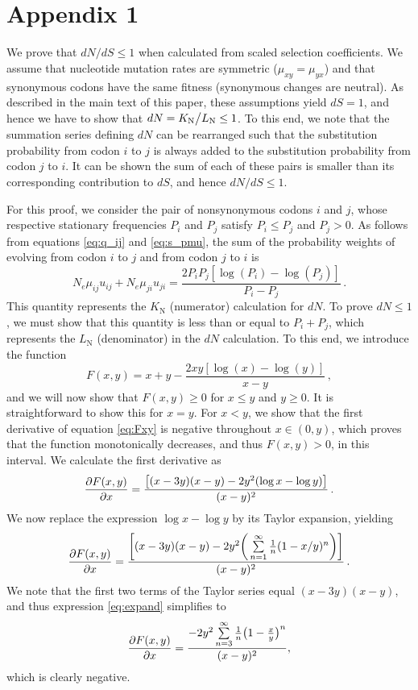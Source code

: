 \documentclass[11pt]{article}
\begin{document}
\section*{Appendix 1}
We prove that $dN/dS \leq 1$ when calculated from scaled selection coefficients. We assume that nucleotide mutation rates are symmetric ($\mu_{xy} = \mu_{yx}$) and that synonymous codons have the same fitness (synonymous changes are neutral). As described in the main text of this paper, these assumptions yield $dS = 1$, and hence we have to show that $dN = K_\text{N}\big{/}L_\text{N} \leq 1$. To this end, we note that the summation series defining $dN$ can be rearranged such that the substitution probability from codon $i$ to $j$ is always added to the substitution probability from codon $j$ to $i$. It can be shown the sum of each of these pairs is smaller than its corresponding contribution to $dS$, and hence $dN/dS \leq 1$.

For this proof, we consider the pair of nonsynonymous codons $i$ and $j$, whose respective stationary frequencies $P_i$ and $P_j$ satisfy $P_i \leq P_j$ and $P_j > 0$. As follows from equations \eqref{eq:q_ij} and \eqref{eq:s_pmu}, the sum of the probability weights of evolving from codon $i$ to $j$ and from codon $j$ to $i$ is
\begin{equation}
N_e\mu_{ij} u_{ij} + N_e\mu_{ji} u_{ji}  = \frac{2P_iP_j[\log(P_i) - \log(P_j)]}{P_i - P_j} \,.
\end{equation}
This quantity represents the $K_\text{N}$ (numerator) calculation for $dN$. To prove $dN \leq 1$, we must show that this quantity is less than or equal to $P_i + P_j$, which represents the $L_\text{N}$ (denominator) in the $dN$ calculation. To this end, we introduce the function 
\begin{equation}\label{eq:Fxy}
F(x,y) = x + y - \frac{2xy[\log(x) - \log(y)]}{x - y} \,,
\end{equation}
and we will now show that $F(x,y) \geq 0$ for $x \leq y$ and $y \geq 0 $. It is straightforward to show this for $x=y$. For $x < y$, we show that the first derivative of equation \eqref{eq:Fxy} is negative throughout $x \in (0,y)$, which proves that the function monotonically decreases, and thus $F(x,y) > 0$, in this interval. We calculate the first derivative as 
\begin{equation}
\frac{\partial{F(x,y)}}{\partial{x}} = \frac{\big{[} (x-3y)(x-y) - 2y^2(\log{x} - \log{y}) \big{]}}{(x-y)^2} \,.
\end{equation}
We now replace the expression $\log{x} - \log{y}$ by its Taylor expansion, yielding
\begin{equation}\label{eq:expand}
	\frac{\partial{F(x,y)}}{\partial{x}} = 
	\frac{ \bigg{[} (x-3y)(x-y) - 2y^2\bigg{(}\sum\limits_{n=1}^\infty \frac{1}{n} (1-x/y)^n\bigg{)} \bigg{]}}{(x-y)^2} \,.
\end{equation} We note that the first two terms of the Taylor series equal $(x-3y)(x-y)$, and thus expression \eqref{eq:expand} simplifies to 
\begin{equation}
\frac{\partial{F(x,y)}}{\partial{x}} = \frac{-2y^2\sum\limits_{n=3}^\infty \frac{1}{n} \big{(}1-\frac{x}{y}\big{)}^n}{(x-y)^2} ,
\end{equation}
which is clearly negative. 
\end{document}
